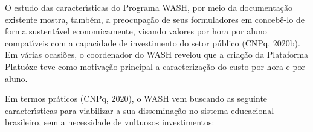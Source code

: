 \documentclass[
12pt,		%
openright,	%
twoside,  %
a4paper,			%
chapter=TITLE,		%
english,			%
french,				%
spanish,			%
brazil				%
]{USPSC-classe/USPSC}
\begin{document}
O estudo das caracter\'{\i}sticas do Programa WASH, por meio da documenta\c{c}\~ao existente mostra, tamb\'em, a preocupa\c{c}\~ao de seus formuladores em conceb\^e-lo de forma sustent\'avel economicamente, visando valores por hora por aluno compat\'{\i}veis com a capacidade de investimento do setor p\'ublico  (CNPq, 2020b). Em v\'arias ocasi\~oes, o coordenador do WASH revelou que a cria\c{c}\~ao da Plataforma Platu\'oxe teve como motiva\c{c}\~ao principal a caracteriza\c{c}\~ao do custo por hora e por aluno.

















Em termos pr\'aticos  (CNPq, 2020), o WASH vem buscando as seguinte caracter\'{\i}sticas para viabilizar a sua dissemina\c{c}\~ao no sistema educacional brasileiro, sem a necessidade de vultuosos investimentos:
\end{document}
